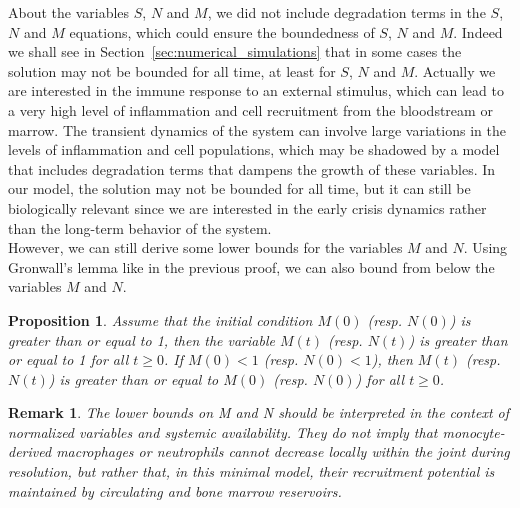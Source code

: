 \documentclass[a4paper, 12pt]{article}
\newtheorem{rem}{Remark}[section]
\newtheorem{proposition}{Proposition}[section]
\providecommand{\DIFaddbegin}{} %
\providecommand{\DIFaddend}{} %
\begin{document}
About the variables $S$, $N$ and $M$, we did not  include degradation terms in the $S$, $N$ and  $M$ equations, which could ensure the boundedness of $S$, $N$ and $M$.
    Indeed we shall see in Section~\ref{sec:numerical_simulations} that in some cases the solution may not be bounded for all time, at least for $S$, $N$ and $M$.
     Actually we are interested in the  immune response to an external stimulus, which can lead to a very high level of inflammation and cell recruitment from the bloodstream or marrow. 
     The transient dynamics of the system can involve large variations in the levels of inflammation and cell populations, which may be shadowed by a model that includes degradation terms that dampens the growth of these variables.
    In our model, the solution may not be bounded for all time,
     but it can still be biologically relevant since we are interested in the early crisis dynamics 
     rather than the long-term behavior of the system.\\
However, we can still derive some lower bounds for the variables $M$ and $N$.    
Using Gronwall's lemma like in the previous proof, we can also bound from below the variables $M$ and  $N$.
\begin{proposition}\DIFaddbegin \label{prop:lower_bounds}
\DIFaddend Assume that the initial condition $M(0)$ (resp. $N(0)$) is greater than or equal to 1, then
the variable $M(t)$ (resp. $N(t)$) is greater than or equal to 1 for all $t \geq 0$. If $M(0) < 1$ (resp. $N(0) < 1$), then $M(t)$ (resp. $N(t)$) is greater than or equal to $M(0)$ (resp. $N(0)$) for all $t \geq 0$.    
\end{proposition}
\begin{rem}
The lower bounds on M and N should be interpreted in the context of normalized variables and systemic availability.
 They do not imply that monocyte-derived macrophages or neutrophils cannot decrease locally within the joint during resolution, but rather that, in this minimal model,
  their recruitment potential is maintained by circulating and bone marrow reservoirs.

\end{rem}
\end{document}

